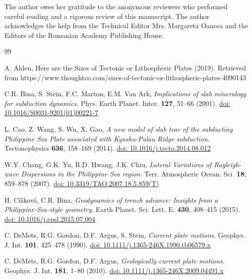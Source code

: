 \documentclass{rrparticle}
\begin{document}
\footnotesize
\singlespacing
\printacronyms[name=Acronyms and Abbreviations, heading=section]

\begin{acknowledgement}
The author owes her gratitude to the anonymous reviewers who performed careful reading and a rigorous review of this manuscript. The author acknowledges the help from the Technical Editor Mrs. Margareta Oancea and the Editors of the Romanian Academy Publishing House. 
\end{acknowledgement}

\begin{thebibliography}{99}

A. Alden, Here are the Sizes of Tectonic or Lithospheric Plates (2019). Retrieved from https://www.thoughtco.com/sizes-of-tectonic-or-lithospheric-plates-4090143 

C.R. Bina, S. Stein, F.C. Marton, E.M. Van Ark, \emph{Implications of slab mineralogy for subduction dynamics}. Phys. Earth Planet. Inter. \textbf{127}, 51--66 (2001). \href{https://doi.org/10.1016/S0031-9201(01)00221-7}{doi: 10.1016/S0031-9201(01)00221-7}

 L. Cao, Z. Wang, S. Wu, X. Gao, \emph{A new model of slab tear of the subducting Philippine Sea Plate associated with Kyushu-Palau Ridge subduction}. Tectonophysics \textbf{636}, 158--169 (2014). \href{https://doi.org/10.1016/j.tecto.2014.08.012}{doi: 10.1016/j.tecto.2014.08.012}

 W.Y. Chang, G.K. Yu, R.D. Hwang, J.K. Chiu, \emph{Lateral Variations of Rayleigh-wave Dispersions in the Philippine Sea region}. Terr. Atmospheric Ocean. Sci. \textbf{18}, 859--878 (2007). \href{https://doi.org/10.3319/TAO.2007.18.5.859(T)}{doi: 10.3319/TAO.2007.18.5.859(T)}

 H. Cížková, C.R. Bina, \emph{Geodynamics of trench advance: Insights from a Philippine-Sea-style geometry}. Earth Planet. Sci. Lett. E. \textbf{430}, 408--415 (2015). \href{https://doi.org/10.1016/j.epsl.2015.07.004}{doi: 10.1016/j.epsl.2015.07.004}

 C. DeMets, R.G. Gordon, D.F. Argus, S. Stein, \emph{Current plate motions}. Geophys. J. Int. \textbf{101}, 425--478 (1990). \href{https://doi.org/10.1111/j.1365-246X.1990.tb06579.x}{doi: 10.1111/j.1365-246X.1990.tb06579.x}

 C. DeMets, R.G. Gordon, D.F. Argus, \emph{Geologically current plate motions}. Geophys. J. Int. \textbf{181}, 1--80 (2010). \href{https://doi.org/10.1111/j.1365-246X.2009.04491.x}{doi: 10.1111/j.1365-246X.2009.04491.x}


\end{thebibliography}
\end{document}
